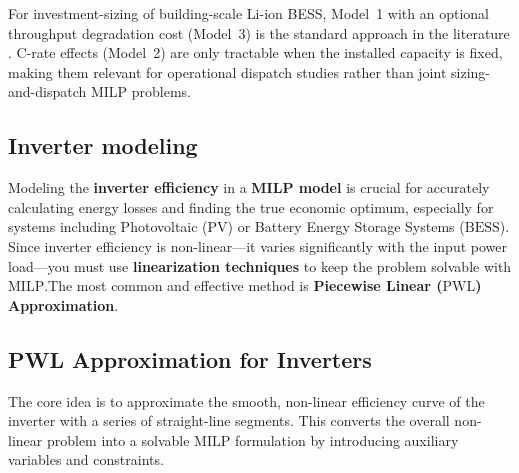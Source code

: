 \documentclass[11pt,a4paper]{report}
\begin{document}
\noindent For investment-sizing of building-scale Li-ion BESS, Model~1 with an optional throughput degradation cost (Model~3) is the standard approach in the literature \cite{Gabrielli2018Electrochemical, cardoso2014milp}.
C-rate effects (Model~2) are only tractable when the installed capacity is fixed, making them relevant for operational dispatch studies rather than joint sizing-and-dispatch MILP problems.
\subsection{Inverter modeling}
\label{sub:inverter_modeling}
Modeling the \textbf{inverter efficiency} in a \textbf{MILP model} is crucial for accurately calculating energy losses and finding the true economic optimum, especially for systems including Photovoltaic ($\text{PV}$) or Battery Energy Storage Systems ($\text{BESS}$). Since inverter efficiency is non-linear—it varies significantly with the input power load—you must use \textbf{linearization techniques} to keep the problem solvable with $\text{MILP}$.The most common and effective method is \textbf{Piecewise Linear ($\text{PWL}$) Approximation}.
\subsection*{PWL Approximation for Inverters}
The core idea is to approximate the smooth, non-linear efficiency curve of the inverter with a series of straight-line segments. This converts the overall non-linear problem into a solvable $\text{MILP}$ formulation by introducing auxiliary variables and constraints.
\end{document}
